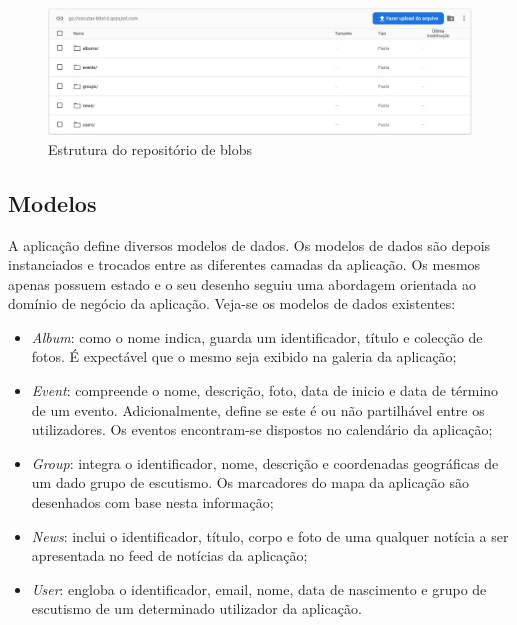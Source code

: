 \documentclass[12pt]{report}
\begin{document}
\bigskip
\begin{figure}[H]
    \centering
    \includegraphics[width=1\textwidth]{storage.png}
    \caption{Estrutura do repositório de \gls{blobs}}
\end{figure}

\subsection{Modelos}

A aplicação define diversos modelos de dados. Os modelos de dados são depois instanciados e trocados entre as diferentes camadas da aplicação. Os mesmos apenas possuem estado e o seu desenho seguiu uma abordagem orientada ao domínio de negócio da aplicação. Veja-se os modelos de dados existentes:

\begin{itemize}
    \item \emph{Album}: como o nome indica, guarda um identificador, título e colecção de fotos. É expectável que o mesmo seja exibido na galeria da aplicação;
    
    \item \emph{Event}: compreende o nome, descrição, foto, data de inicio e data de término de um evento. Adicionalmente, define se este é ou não partilhável entre os utilizadores. Os eventos encontram-se dispostos no calendário da aplicação;
    
    \item \emph{Group}: integra o identificador, nome, descrição e coordenadas geográficas de um dado grupo de escutismo. Os marcadores do mapa da aplicação são desenhados com base nesta informação;
    
    \item \emph{News}: inclui o identificador, título, corpo e foto de uma qualquer notícia a ser apresentada no feed de notícias da aplicação;
    
    \item \emph{User}: engloba o identificador, email, nome, data de nascimento e grupo de escutismo de um determinado utilizador da aplicação.
\end{itemize}
\end{document}
